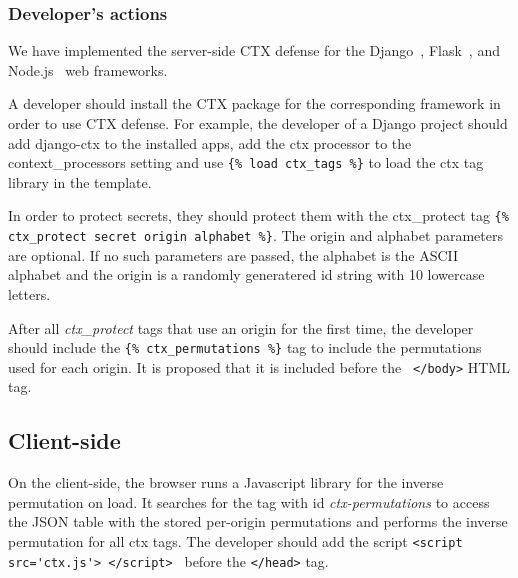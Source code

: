 \documentclass[a4paper, 11 pt, conference]{article}  %
\begin{document}
\subsubsection{Developer's actions}
We have implemented the server-side CTX defense for the Django~\cite{c13},
Flask~\cite{c14}, and Node.js~\cite{c15} web frameworks.

A developer should install the CTX package for the corresponding framework in
order to use CTX defense. For example, the developer of a Django project should
add django-ctx to the installed apps, add the ctx processor to the
context\_processors setting and use \lstinline|{% load ctx_tags %}| to load the ctx tag library in the template.

In order to protect secrets, they should protect them with the ctx\_protect tag \lstinline|{% ctx_protect secret origin alphabet %}|. The origin and alphabet parameters are optional. If no such parameters are passed, the alphabet is the ASCII alphabet and the origin is a randomly generatered id string with 10 lowercase letters.

After all \textit{ctx\_protect} tags that use an origin for the first time, the developer should include the \lstinline|{% ctx_permutations %}| tag to include the permutations used for each origin. It is proposed that it is included before the \lstinline| </body>| HTML tag.

\subsection{Client-side}
On the client-side, the browser runs a Javascript library for the inverse permutation on load. It searches for the tag with id \textit{ctx-permutations} to access the JSON table with the stored per-origin permutations and performs the inverse permutation for all ctx tags.
The developer should add the script \lstinline|<script src='ctx.js'> </script> | before the \lstinline|</head>| tag.
\end{document}

